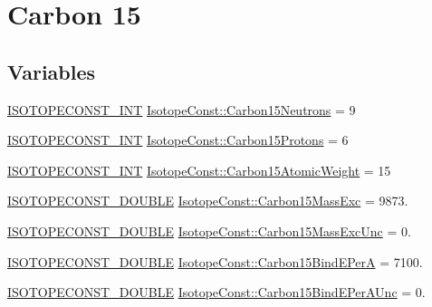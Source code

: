 \hypertarget{group___isotope_const-_carbon-_c15}{}\section{Carbon 15}
\label{group___isotope_const-_carbon-_c15}
\subsection*{Variables}
\begin{DoxyCompactItemize}
\item 
\mbox{\hyperlink{group___isotope_const-_macros_ga5f18360b3e99483a35c32d789e62621c}{I\+S\+O\+T\+O\+P\+E\+C\+O\+N\+S\+T\+\_\+\+I\+NT}} \mbox{\hyperlink{group___isotope_const-_carbon-_c15_ga91eb4948bc7bfe8bc62723004cc6c9ee}{Isotope\+Const\+::\+Carbon15\+Neutrons}} = 9
\item 
\mbox{\hyperlink{group___isotope_const-_macros_ga5f18360b3e99483a35c32d789e62621c}{I\+S\+O\+T\+O\+P\+E\+C\+O\+N\+S\+T\+\_\+\+I\+NT}} \mbox{\hyperlink{group___isotope_const-_carbon-_c15_ga19a6d12cd360578793b9399f1c361d91}{Isotope\+Const\+::\+Carbon15\+Protons}} = 6
\item 
\mbox{\hyperlink{group___isotope_const-_macros_ga5f18360b3e99483a35c32d789e62621c}{I\+S\+O\+T\+O\+P\+E\+C\+O\+N\+S\+T\+\_\+\+I\+NT}} \mbox{\hyperlink{group___isotope_const-_carbon-_c15_ga93f80660e07e60bbcaec3e9c3f47d461}{Isotope\+Const\+::\+Carbon15\+Atomic\+Weight}} = 15
\item 
\mbox{\hyperlink{group___isotope_const-_macros_ga8f45a7272ce02c0b4c65c44636ed719a}{I\+S\+O\+T\+O\+P\+E\+C\+O\+N\+S\+T\+\_\+\+D\+O\+U\+B\+LE}} \mbox{\hyperlink{group___isotope_const-_carbon-_c15_ga4de7dcb7b262f2ab5bb39089829a6c7e}{Isotope\+Const\+::\+Carbon15\+Mass\+Exc}} = 9873.
\item 
\mbox{\hyperlink{group___isotope_const-_macros_ga8f45a7272ce02c0b4c65c44636ed719a}{I\+S\+O\+T\+O\+P\+E\+C\+O\+N\+S\+T\+\_\+\+D\+O\+U\+B\+LE}} \mbox{\hyperlink{group___isotope_const-_carbon-_c15_ga9f5b52b0225f388f508471ff17416a71}{Isotope\+Const\+::\+Carbon15\+Mass\+Exc\+Unc}} = 0.
\item 
\mbox{\hyperlink{group___isotope_const-_macros_ga8f45a7272ce02c0b4c65c44636ed719a}{I\+S\+O\+T\+O\+P\+E\+C\+O\+N\+S\+T\+\_\+\+D\+O\+U\+B\+LE}} \mbox{\hyperlink{group___isotope_const-_carbon-_c15_gaae64e75e642ea25255a2130fb953fca1}{Isotope\+Const\+::\+Carbon15\+Bind\+E\+PerA}} = 7100.
\item 
\mbox{\hyperlink{group___isotope_const-_macros_ga8f45a7272ce02c0b4c65c44636ed719a}{I\+S\+O\+T\+O\+P\+E\+C\+O\+N\+S\+T\+\_\+\+D\+O\+U\+B\+LE}} \mbox{\hyperlink{group___isotope_const-_carbon-_c15_ga015975871b8bb4ba326ce0219cae2ceb}{Isotope\+Const\+::\+Carbon15\+Bind\+E\+Per\+A\+Unc}} = 0.

\end{DoxyCompactItemize}
